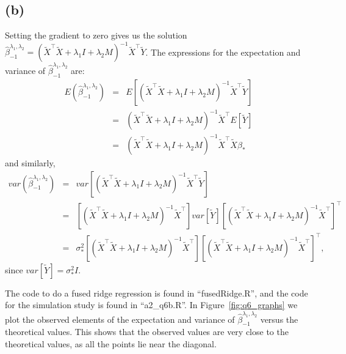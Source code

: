 \documentclass{article}\usepackage[]{graphicx}\usepackage[]{color}
\begin{document}
\subsection*{(b)}
Setting the gradient to zero gives us the solution $\hat{\beta}^{\lambda_1,\lambda_2}_{-1}=(\tilde{X}^\top\tilde{X} + \lambda_1 I + \lambda_2 M)^{-1} \tilde{X}^\top\tilde{Y}$. The expressions for the expectation and variance of $\hat{\beta}^{\lambda_1,\lambda_2}_{-1}$ are:
\begin{eqnarray*}
  E(\hat{\beta}^{\lambda_1,\lambda_2}_{-1}) &=& E\left[ (\tilde{X}^\top\tilde{X} + \lambda_1 I + \lambda_2 M)^{-1} \tilde{X}^\top\tilde{Y} \right] \\
  &=& (\tilde{X}^\top\tilde{X} + \lambda_1 I + \lambda_2 M)^{-1}\tilde{X}^\top E[\tilde{Y}] \\
  &=& (\tilde{X}^\top\tilde{X} + \lambda_1 I + \lambda_2 M)^{-1}\tilde{X}^\top\tilde{X}\beta_*
\end{eqnarray*}
and similarly,
\begin{eqnarray*}
  var(\hat{\beta}^{\lambda_1,\lambda_2}_{-1}) &=& var\left[ (\tilde{X}^\top\tilde{X} + \lambda_1 I + \lambda_2 M)^{-1} \tilde{X}^\top\tilde{Y} \right] \\
  &=& \left[ (\tilde{X}^\top\tilde{X} + \lambda_1 I + \lambda_2 M)^{-1} \tilde{X}^\top \right] var[\tilde{Y}] \left[ (\tilde{X}^\top\tilde{X} + \lambda_1 I + \lambda_2 M)^{-1} \tilde{X}^\top \right]^\top \\
  &=& \sigma^2_* \left[ (\tilde{X}^\top\tilde{X} + \lambda_1 I + \lambda_2 M)^{-1} \tilde{X}^\top \right]  \left[ (\tilde{X}^\top\tilde{X} + \lambda_1 I + \lambda_2 M)^{-1} \tilde{X}^\top \right]^\top,
\end{eqnarray*}
since $var[\tilde{Y}]=\sigma^2_* I$.

The code to do a fused ridge regression is found in ``fusedRidge.R'', and the code for the simulation study is found in ``a2\_q6b.R''.  In Figure~\ref{fig:q6_graphs} we plot the observed elements of the expectation and variance of $\hat{\beta}^{\lambda_1,\lambda_2}_{-1}$ versus the theoretical values.  This shows that the  observed values are very close to the theoretical values, as all the points lie near the diagonal.
\end{document}
